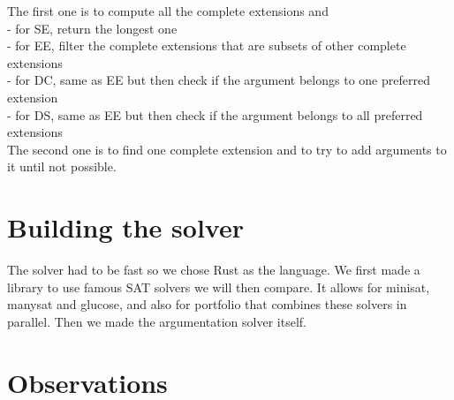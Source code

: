 \documentclass[11pt]{article}
\begin{document}
The first one is to compute all the complete extensions and \\
 - for SE, return the longest one \\
 - for EE, filter the complete extensions that are subsets of other complete extensions \\
 - for DC, same as EE but then check if the argument belongs to one preferred extension \\
 - for DS, same as EE but then check if the argument belongs to all preferred extensions \\
The second one is to find one complete extension and to try to add arguments to it until not possible.

\section{Building the solver}
The solver had to be fast so we chose Rust as the language. We first made a library\cite{portfoliolib} to use famous SAT solvers we will then compare. It allows for minisat, manysat and glucose, and also for portfolio that combines these solvers in parallel. Then we made the argumentation solver itself\cite{argsolver}.

\section{Observations}



\end{document}
